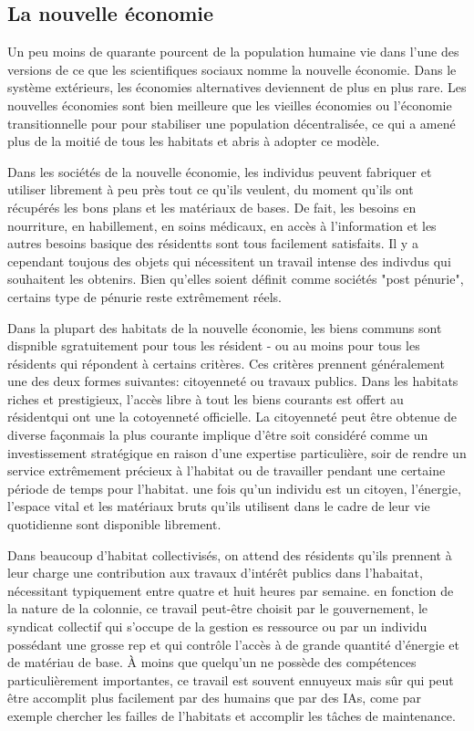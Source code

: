 \subsection{La nouvelle économie} \label{sec:new-economy} 

Un peu moins de quarante pourcent de la population humaine vie dans l'une des versions de ce que les scientifiques sociaux nomme la nouvelle économie. Dans le système extérieurs, les économies alternatives deviennent de plus en plus rare. Les nouvelles économies sont bien meilleure que les vieilles économies ou l'économie transitionnelle pour pour stabiliser une population décentralisée, ce qui a amené plus de la moitié de tous les habitats et abris à adopter ce modèle. 

Dans les sociétés de la nouvelle économie, les individus peuvent fabriquer et utiliser librement à peu près tout ce qu'ils veulent, du moment qu'ils ont récupérés les bons plans et les matériaux de bases. De fait, les besoins en nourriture, en habillement, en soins médicaux, en accès à l'information et les autres besoins basique des résidentts sont tous facilement satisfaits. Il y a cependant toujous des objets qui nécessitent un travail intense des indivdus qui souhaitent les obtenirs. Bien qu'elles soient définit comme sociétés "post pénurie", certains type de pénurie reste extrêmement réels. 

Dans la plupart des habitats de la nouvelle économie, les biens communs sont dispnible sgratuitement pour tous les résident - ou au moins pour tous les résidents qui répondent à certains critères. Ces critères prennent généralement une des deux formes suivantes: citoyenneté ou travaux publics. Dans les habitats riches et prestigieux, l'accès libre à tout les biens courants est offert au résidentqui ont une la cotoyenneté officielle. La citoyenneté peut être obtenue de diverse façonmais la plus courante implique d'être soit considéré comme un investissement stratégique en raison d'une expertise particulière, soir de rendre un service extrêmement précieux à l'habitat ou de travailler pendant une certaine période de temps pour l'habitat. une fois qu'un individu est un citoyen, l'énergie, l'espace vital et les matériaux bruts qu'ils utilisent dans le cadre de leur vie quotidienne sont disponible librement. 

Dans beaucoup d'habitat collectivisés, on attend des résidents qu'ils prennent à leur charge une contribution aux travaux d'intérêt publics dans l'habaitat, nécessitant typiquement entre quatre et huit heures par semaine. en fonction de la nature de la colonnie, ce travail peut-être choisit par le gouvernement, le syndicat collectif qui s'occupe de la gestion es ressource ou par un individu possédant une grosse rep et qui contrôle l'accès à de grande quantité d'énergie et de matériau de base. À moins que quelqu'un ne possède des compétences particulièrement importantes, ce travail est souvent ennuyeux mais sûr qui peut être accomplit plus facilement par des humains que par des IAs, come par exemple chercher les failles de l'habitats et accomplir les tâches de maintenance. 

